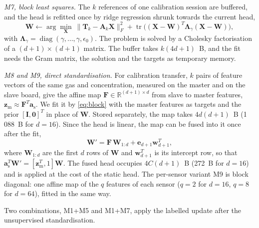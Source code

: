 \documentclass[journal,twoside,web]{ieeecolor}
\begin{document}
\emph{M7, block least squares.} The $k$ references of one calibration session are buffered, and the head is refitted once by ridge regression shrunk towards the current head,
\begin{equation}
\boldsymbol W\leftarrow\arg\min_{\boldsymbol X}\ \|\boldsymbol T_k-\boldsymbol A_k\boldsymbol X\|_F^2+\operatorname{tr}\bigl((\boldsymbol X-\boldsymbol W)^T\boldsymbol\Lambda_\gamma(\boldsymbol X-\boldsymbol W)\bigr),
\label{eq:block}
\end{equation}
with $\boldsymbol\Lambda_\gamma=\operatorname{diag}(\gamma,\dots,\gamma,\epsilon_0)$. The problem is solved by a Cholesky factorisation of a $(d+1)\times(d+1)$ matrix. The buffer takes $k(4d+1)$~B, and the fit needs the Gram matrix, the solution and the targets as temporary memory.

\emph{M8 and M9, direct standardisation.} For calibration transfer, $k$ pairs of feature vectors of the same gas and concentration, measured on the master and on the slave board, give the affine map $\boldsymbol F\in\mathbb R^{(d+1)\times d}$ from slave to master features, $\boldsymbol z_{\mathrm m}\approx\boldsymbol F^T\boldsymbol a_{\mathrm s}$. We fit it by \eqref{eq:block} with the master features as targets and the prior $[\boldsymbol I,\boldsymbol 0]^T$ in place of $\boldsymbol W$. Stored separately, the map takes $4d(d+1)$~B (1\,088~B for $d=16$). Since the head is linear, the map can be fused into it once after the fit,
\begin{equation}
\boldsymbol W'=\boldsymbol F\,\boldsymbol W_{1:d}+\boldsymbol e_{d+1}\boldsymbol w_{d+1}^T,
\label{eq:fuse}
\end{equation}
where $\boldsymbol W_{1:d}$ are the first $d$ rows of $\boldsymbol W$ and $\boldsymbol w_{d+1}^T$ is its intercept row, so that $\boldsymbol a_{\mathrm s}^T\boldsymbol W'=[\boldsymbol z_{\mathrm m}^T,1]\boldsymbol W$. The fused head occupies $4C(d+1)$~B (272~B for $d=16$) and is applied at the cost of the static head. The per-sensor variant M9 is block diagonal: one affine map of the $q$ features of each sensor ($q=2$ for $d=16$, $q=8$ for $d=64$), fitted in the same way.

Two combinations, M1+M5 and M1+M7, apply the labelled update after the unsupervised standardisation.
\end{document}
